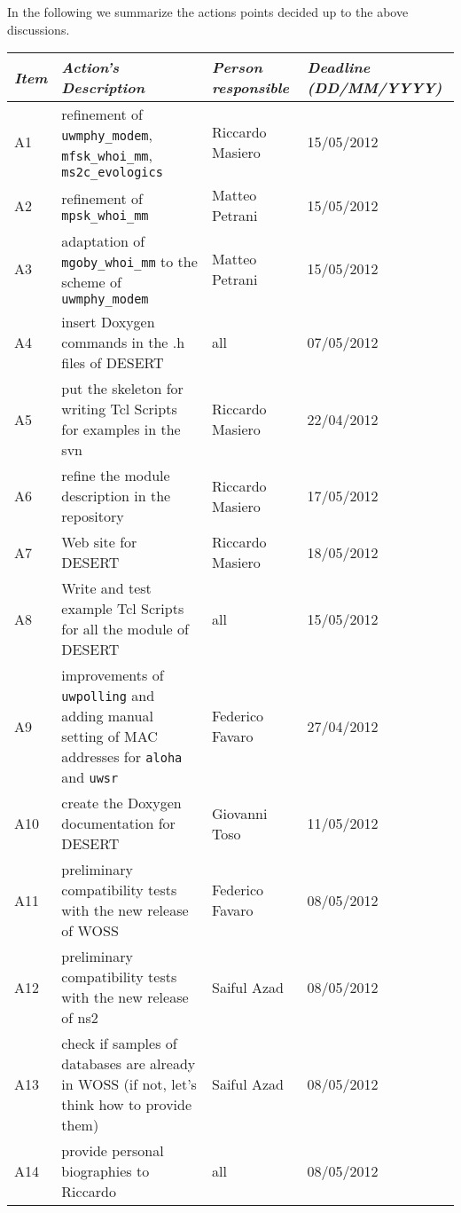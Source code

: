 \documentclass[11pt,journal,draftclsnofoot,onecolumn,twoside,letterpaper]{IEEEtran}
\theoremstyle{definition} \newtheorem{definition}[]{Definition}
\theoremstyle{theorem} \newtheorem{theorem}[]{Theorem}
\begin{document}
\newpage


In the following we summarize the actions points decided up to the above discussions. 

\begin{tabular}{|p{}|p{}|p{}|p{}|}
\hline
{\it Item} & {\it Action's Description} & {\it Person responsible} & {\it Deadline (DD/MM/YYYY)}\\
\hline
A1 & refinement of {\tt uwmphy\_modem}, {\tt mfsk\_whoi\_mm}, {\tt ms2c\_evologics} & Riccardo Masiero & 15/05/2012 \\ 
A2 & refinement of {\tt mpsk\_whoi\_mm} & Matteo Petrani & 15/05/2012 \\
A3 & adaptation of {\tt mgoby\_whoi\_mm} to the scheme of {\tt uwmphy\_modem} & Matteo Petrani & 15/05/2012 \\
A4 & insert Doxygen commands in the .h files of DESERT & all & 07/05/2012 \\
A5 & put the skeleton for writing Tcl Scripts for examples in the svn  & Riccardo Masiero & 22/04/2012 \\
A6 & refine the module description in the repository & Riccardo Masiero & 17/05/2012 \\
A7 & Web site for DESERT & Riccardo Masiero & 18/05/2012 \\
A8 & Write and test example Tcl Scripts for all the module of DESERT & all & 15/05/2012 \\
A9 & improvements of {\tt uwpolling} and adding manual setting of MAC addresses for {\tt aloha} and {\tt uwsr} & Federico Favaro & 27/04/2012 \\
A10 & create the Doxygen documentation for DESERT & Giovanni Toso & 11/05/2012 \\
A11 & preliminary compatibility tests with the new release of WOSS & Federico Favaro & 08/05/2012 \\
A12 & preliminary compatibility tests with the new release of ns2 & Saiful Azad & 08/05/2012 \\
A13 & check if samples of databases are already in WOSS (if not, let's think how to provide them) & Saiful Azad & 08/05/2012 \\
A14 & provide personal biographies to Riccardo & all & 08/05/2012 \\
\hline
\end{tabular}
\ \\
\end{document}
